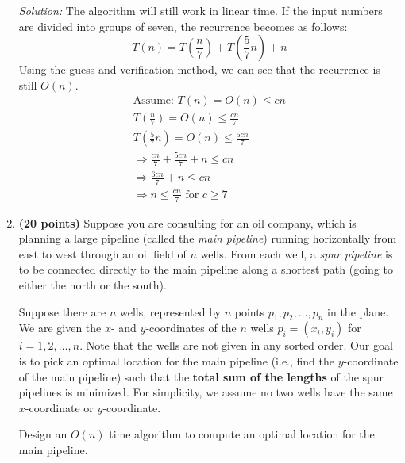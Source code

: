 \documentclass[11pt]{article}
\begin{document}
\begin{enumerate}
\textit{Solution:} The algorithm will still work in linear time. If the input numbers are divided into groups of seven, the recurrence becomes as follows:
\[T(n) = T\left(\frac{n}{7}\right) + T\left(\frac{5}{7}n\right) + n\]
Using the guess and verification method, we can see that the recurrence is still $O(n)$.
\begin{gather}
\text{Assume: } T(n) = O(n) \leq cn \\
 T\left(\frac{n}{7}\right) = O(n) \leq \frac{cn}{7} \\
 T\left(\frac{5}{7}n\right) = O(n) \leq \frac{5cn}{7} \\
 \Rightarrow \frac{cn}{7} + \frac{5cn}{7} + n \leq cn \\
 \Rightarrow \frac{6cn}{7} + n \leq cn \\
 \Rightarrow n \leq \frac{cn}{7} \text{ for } c \geq 7
\end{gather}

\item
{\bf (20 points)}
Suppose you are consulting for an oil company, which is planning a
large pipeline (called the {\em main pipeline}) running horizontally from east to west through
an oil field of $n$ wells. From each well, a {\em spur pipeline} is to
be connected directly to the main pipeline along a shortest path
(going to either the north or the south).

Suppose there are $n$ wells, represented by $n$ points $p_1,p_2,\ldots,p_n$ in the plane.
We are given the $x$- and $y$-coordinates of the $n$ wells $p_i=(x_i,y_i)$ for $i=1,2,\ldots,n$. Note that the wells are not given in any sorted order. Our goal is to pick an optimal location for the main pipeline (i.e., find the $y$-coordinate of the main pipeline) such that the
{\bf total sum of the lengths} of the spur pipelines is minimized. For simplicity, we assume no two wells have the same $x$-coordinate or $y$-coordinate.

Design an $O(n)$ time algorithm to compute an optimal location for the
main pipeline.


\end{enumerate}
\end{document}
